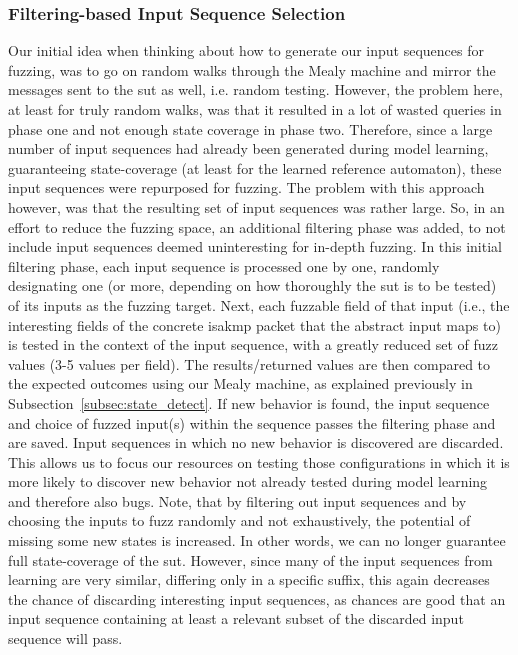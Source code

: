 \subsubsection{Filtering-based Input Sequence Selection} \label{subsubsec:fuzz_filtering}
Our initial idea when thinking about how to generate our input sequences for fuzzing, was to go on random walks through the Mealy machine and mirror the messages sent to the \ac{sut} as well, i.e. random testing. However, the problem here, at least for truly random walks, was that it resulted in a lot of wasted queries in phase one and not enough state coverage in phase two. Therefore, since a large number of input sequences had already been generated during model learning, guaranteeing state-coverage (at least for the learned reference automaton), these input sequences were repurposed for fuzzing. The problem with this approach however, was that the resulting set of input sequences was rather large. So, in an effort to reduce the fuzzing space, an additional filtering phase was added, to not include input sequences deemed uninteresting for in-depth fuzzing. In this initial filtering phase, each input sequence is processed one by one, randomly designating one (or more, depending on how thoroughly the \ac{sut} is to be tested) of its inputs as the fuzzing target. Next, each fuzzable field of that input (i.e., the interesting fields of the concrete \ac{isakmp} packet that the abstract input maps to) is tested in the context of the input sequence, with a greatly reduced set of fuzz values (3-5 values per field). The results/returned values are then compared to the expected outcomes using our Mealy machine, as explained previously in Subsection~\ref{subsec:state_detect}. If new behavior is found, the input sequence and choice of fuzzed input(s) within the sequence passes the filtering phase and are saved. Input sequences in which no new behavior is discovered are discarded. This allows us to focus our resources on testing those configurations in which it is more likely to discover new behavior not already tested during model learning and therefore also bugs.
Note, that by filtering out input sequences and by choosing the inputs to fuzz randomly and not exhaustively, the potential of missing some new states is increased. In other words, we can no longer guarantee full state-coverage of the \ac{sut}. However, since many of the input sequences from learning are very similar, differing only in a specific suffix, this again decreases the chance of discarding interesting input sequences, as chances are good that an input sequence containing at least a relevant subset of the discarded input sequence will pass.

